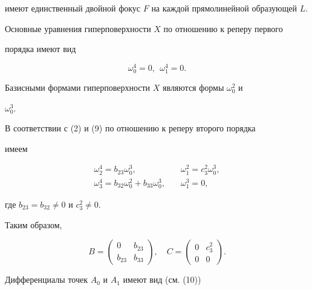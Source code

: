 имеют единственный двойной фокус $F$ на каждой прямолинейной образующей $L$.


Основные уравнения гиперповерхности $X$ по отношению к реперу первого


порядка имеют вид


$$




\omega_0^4 = 0, \ \ \omega_1^4 = 0.




$$


Базисными формами гиперповерхности  $X$ являются формы  $\omega_0^2$ и


$\omega_0^3$.


В соответствии с (2) и (9) по отношению к реперу второго порядка


имеем 


\begin{equation}\label{eq:16}


\begin{array}{ll}


\omega_2^4 =  b_{23} \omega^3_0, 


& \omega_1^2 = c_3^2 \omega^3_0, \\


\omega_3^4 = b_{32} \omega^2_0 + b_{33} \omega^3_0, \quad


& \omega_1^3 = 0,


\end{array}


\end{equation}


где $b_{23} = b_{32} \neq 0$ и $c_3^2 \neq 0$.


Таким образом, 


$$


B = \begin{pmatrix} 0 & b_{23} \\ b_{23} & b_{33} \end{pmatrix},\quad


C = \begin{pmatrix}0 & c_3^2 \\ 0 & 0 \end{pmatrix}.


$$





Дифференциалы точек $A_0$ и $A_1$ имеют вид (см. (10))



